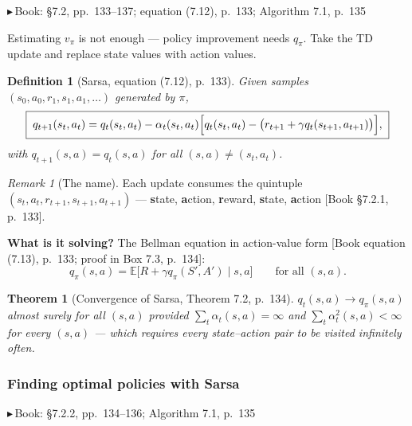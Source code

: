 \documentclass[11pt, letterpaper]{article}
\theoremstyle{runin}
\newtheorem*{definition}{Definition}
\theoremstyle{runinplain}
\newtheorem{theorem}{Theorem}[section]
\theoremstyle{remark}
\newtheorem*{remark}{Remark}
\newcommand{\E}{\mathbb{E}}
\newcommand{\bk}[1]{{\color{bookblue}\small$\blacktriangleright$\,\textsf{Book: #1}}}
\newcommand{\bkin}[1]{{\color{bookblue}\small[\textsf{Book #1}]}}
\begin{document}
\bk{\S7.2, pp.~133--137; equation (7.12), p.~133; Algorithm 7.1, p.~135}

Estimating $v_\pi$ is not enough --- policy improvement needs $q_\pi$. Take the TD
update and replace state values with action values.

\begin{definition}[Sarsa, equation (7.12), p.~133]
Given samples $(s_0,a_0,r_1,s_1,a_1,\dots)$ generated by $\pi$,
\[
  \boxed{\;
  q_{t+1}(s_t,a_t)=q_t(s_t,a_t)-\alpha_t(s_t,a_t)
    \Bigl[q_t(s_t,a_t)-\bigl(r_{t+1}+\gamma q_t(s_{t+1},a_{t+1})\bigr)\Bigr],\;}
\]
with $q_{t+1}(s,a)=q_t(s,a)$ for all $(s,a)\neq(s_t,a_t)$.
\end{definition}

\begin{remark}[The name]
Each update consumes the quintuple $(s_t,a_t,r_{t+1},s_{t+1},a_{t+1})$ ---
\textbf{s}tate, \textbf{a}ction, \textbf{r}eward, \textbf{s}tate, \textbf{a}ction
\bkin{\S7.2.1, p.~133}.
\end{remark}

\textbf{What is it solving?} The Bellman equation in action-value form
\bkin{equation (7.13), p.~133; proof in Box 7.3, p.~134}:
\[
  q_\pi(s,a)=\E\bigl[R+\gamma q_\pi(S',A')\mid s,a\bigr]\qquad\text{for all }(s,a).
\]

\begin{theorem}[Convergence of Sarsa, Theorem 7.2, p.~134]
$q_t(s,a)\to q_\pi(s,a)$ almost surely for all $(s,a)$ provided
$\sum_t\alpha_t(s,a)=\infty$ and $\sum_t\alpha_t^2(s,a)<\infty$ for every
$(s,a)$ --- which requires every \emph{state--action pair} to be visited infinitely
often.
\end{theorem}

\subsubsection{Finding optimal policies with Sarsa}

\bk{\S7.2.2, pp.~134--136; Algorithm 7.1, p.~135}
\end{document}
